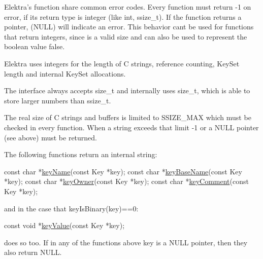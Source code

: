 Elektra’s function share common error codes. Every function must return {\ttfamily -\/1} on error, if its return type is integer (like {\ttfamily int}, {\ttfamily ssize\+\_\+t}). If the function returns a pointer, {} ({\ttfamily N\+U\+LL}) will indicate an error. This behavior can\textquotesingle{}t be used for functions that return integers, since {} is a valid size and can also be used to represent the boolean value {\ttfamily false}.

Elektra uses integers for the length of C strings, reference counting, {\ttfamily Key\+Set} length and internal {\ttfamily Key\+Set} allocations.

The interface always accepts {\ttfamily size\+\_\+t} and internally uses {\ttfamily size\+\_\+t}, which is able to store larger numbers than {\ttfamily ssize\+\_\+t}.

The real size of C strings and buffers is limited to {\ttfamily S\+S\+I\+Z\+E\+\_\+\+M\+AX} which must be checked in every function. When a string exceeds that limit {\ttfamily -\/1} or a {\ttfamily N\+U\+LL} pointer (see above) must be returned.

The following functions return an internal string\+:


\begin{DoxyCode}
\textcolor{keyword}{const} \textcolor{keywordtype}{char} *\hyperlink{group__keyname_ga8e805c726a60da921d3736cda7813513}{keyName}(\textcolor{keyword}{const} Key *key);
\textcolor{keyword}{const} \textcolor{keywordtype}{char} *\hyperlink{group__keyname_gaaff35e7ca8af5560c47e662ceb9465f5}{keyBaseName}(\textcolor{keyword}{const} Key *key);
\textcolor{keyword}{const} \textcolor{keywordtype}{char} *\hyperlink{owner_8c_af6485fb8599714b6bbd830cf915ffea5}{keyOwner}(\textcolor{keyword}{const} Key *key);
\textcolor{keyword}{const} \textcolor{keywordtype}{char} *\hyperlink{group__meta_gac89fd319783b3457db45b4c09e55274a}{keyComment}(\textcolor{keyword}{const} Key *key);
\end{DoxyCode}


and in the case that {\ttfamily key\+Is\+Binary(key)==0}\+:


\begin{DoxyCode}
\textcolor{keyword}{const} \textcolor{keywordtype}{void} *\hyperlink{group__keyvalue_ga6f29609c5da53c6dc26a98678d5752af}{keyValue}(\textcolor{keyword}{const} Key *key);
\end{DoxyCode}


does so too. If in any of the functions above {\ttfamily key} is a {\ttfamily N\+U\+LL} pointer, then they also return {\ttfamily N\+U\+LL}.

